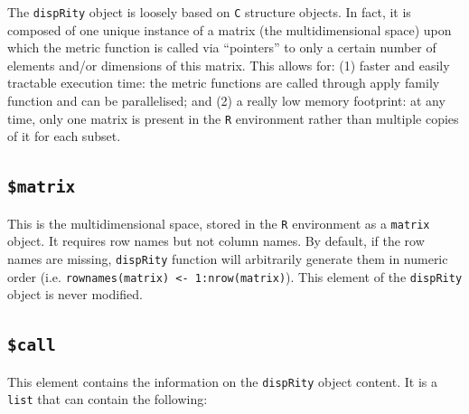 \documentclass[]{book}
\theoremstyle{definition}
\theoremstyle{definition}
\theoremstyle{definition}
\theoremstyle{remark}
\begin{document}
The \texttt{dispRity} object is loosely based on \texttt{C} structure
objects. In fact, it is composed of one unique instance of a matrix (the
multidimensional space) upon which the metric function is called via
``pointers'' to only a certain number of elements and/or dimensions of
this matrix. This allows for: (1) faster and easily tractable execution
time: the metric functions are called through apply family function and
can be parallelised; and (2) a really low memory footprint: at any time,
only one matrix is present in the \texttt{R} environment rather than
multiple copies of it for each subset.

\subsection{\texorpdfstring{\texttt{\$matrix}}{\$matrix}}\label{matrix}

This is the multidimensional space, stored in the \texttt{R} environment
as a \texttt{matrix} object. It requires row names but not column names.
By default, if the row names are missing, \texttt{dispRity} function
will arbitrarily generate them in numeric order (i.e.
\texttt{rownames(matrix)\ \textless{}-\ 1:nrow(matrix)}). This element
of the \texttt{dispRity} object is never modified.

\subsection{\texorpdfstring{\texttt{\$call}}{\$call}}\label{call}

This element contains the information on the \texttt{dispRity} object
content. It is a \texttt{list} that can contain the following:
\end{document}
